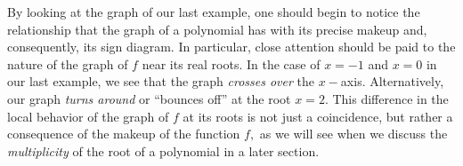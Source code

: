 \documentclass[12pt]{book}
\theoremstyle{definition}
\begin{document}
By looking at the graph of our last example, one should begin to notice the relationship that the graph of a polynomial has with its precise makeup and, consequently, its sign diagram.  In particular, close attention should be paid to the nature of the graph of $f$ near its real roots.  In the case of $x=-1$ and $x=0$ in our last example, we see that the graph {\it crosses over} the $x-$axis.  Alternatively, our graph {\it turns around} or ``bounces off'' at the root $x=2$.  This difference in the local behavior of the graph of $f$ at its roots is not just a coincidence, but rather a consequence of the makeup of the function $f,$ as we will see when we discuss the {\it multiplicity} of the root of a polynomial in a later section.
\newpage
\end{document}
